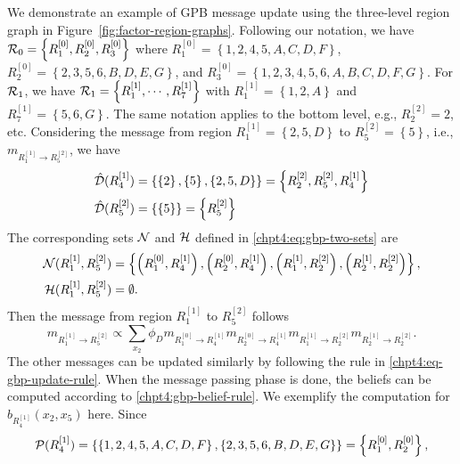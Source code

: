 \begin{example}
  We demonstrate an example of GPB message update using the three-level region graph in Figure~\ref{fig:factor-region-graphs}. Following our notation, we have $\mathcal{R}_0 = \left\{ R_1^{[0]}, R_2^{[0]}, R_3^{[0]} \right\}$ where $R_1^{[0]} = \left\{ 1, 2, 4, 5, A, C, D, F \right\}$, $R_2^{[0]} = \left\{ 2, 3, 5, 6, B, D, E, G \right\}$, and $R_3^{[0]} = \left\{ 1, 2, 3, 4, 5, 6, A, B, C, D, F, G \right\}$. For $\mathcal{R}_1$, we have $\mathcal{R}_1 = \left\{ R_1^{[1]}, \cdots , R_7^{[1]} \right\}$ with $R_1^{[1]} = \left\{ 1, 2, A \right\}$ and $R_7^{[1]} = \left\{ 5, 6, G \right\}$. The same notation applies to the bottom level, e.g., $R^{[2]}_2 = {2}$, etc.
  Considering the message from region $R^{[1]}_1 = \left\{ 2, 5, D \right\}$ to $R^{[2]}_5 = \left\{ 5 \right\}$, i.e., $m_{R^{[1]}_1 \rightarrow R^{[2]}_5}$, we have
  \begin{align*}
    \hat{\mathcal{D}}(R^{[1]}_4) &= \left\{ \left\{ 2 \right\}, \left\{ 5 \right\}, \left\{ 2, 5, D \right\}\right\} = \left\{ R^{[2]}_2, R^{[2]}_5, R^{[1]}_4 \right\} \\
    \hat{\mathcal{D}}(R^{[2]}_5) & = \left\{ \left\{ 5 \right\} \right\} = \left\{ R^{[2]}_5 \right\}
  \end{align*}
  The corresponding sets $\mathcal{N}$ and $\mathcal{H}$ defined in \eqref{chpt4:eq:gbp-two-sets} are
  \begin{align*}
    \mathcal{N}(R^{[1]}_1, R^{[2]}_5) & = \left\{ \left( R^{[0]}_1, R^{[1]}_4 \right), \left( R^{[0]}_2, R^{[1]}_4 \right), \left( R^{[1]}_1, R^{[2]}_2 \right), \left( R^{[1]}_2, R^{[2]}_2 \right) \right\}, \\
    \mathcal{H}(R^{[1]}_1, R^{[2]}_5) & = \emptyset.
  \end{align*}
  Then the message from region $R^{[1]}_1$ to $R^{[2]}_5$ follows
  \begin{equation*}
    m_{R^{[1]}_1 \rightarrow R^{[2]}_5} \propto \sum_{x_2}\phi_D m_{R^{[0]}_1\rightarrow R^{[1]}_4} m_{R^{[0]}_2\rightarrow R^{[1]}_4} m_{ R^{[1]}_1\rightarrow R^{[2]}_2 } m_{ R^{[1]}_2 \rightarrow R^{[2]}_2}.
    \end{equation*}
    The other messages can be updated similarly by following the rule in \eqref{chpt4:eq-gbp-update-rule}. When the message passing phase is done, the beliefs can be computed according to \eqref{chpt4:gbp-belief-rule}. We exemplify the computation for $b_{R^{[1]}_4}(x_2, x_5)$ here. Since
    \begin{align*}
      \Pp(R^{[1]}_4)  &= \left\{ \left\{ 1, 2, 4, 5, A, C, D, F \right\}, \left\{ 2, 3, 5, 6, B, D, E, G \right\} \right\}=\left\{ R_1^{[0]}, R_2^{[0]}\right\}, \\

\end{align*}
\end{example}
